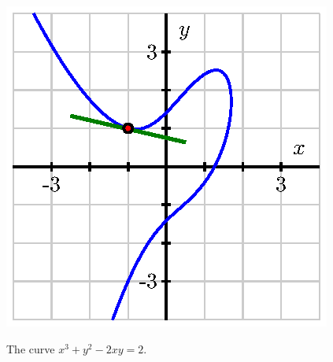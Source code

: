 \begin{marginfigure}[1cm]
\includegraphics{figures/2_7_Ex1.eps}
\caption{The curve $x^3 + y^2 - 2xy = 2$.} \label{fig:2-7_Eg1}
\end{marginfigure}


